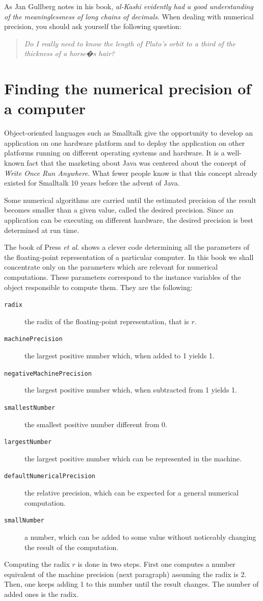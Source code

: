 \documentclass[twoside]{book}
\begin{document}
As Jan Gullberg notes in his book, {\it al-Kashi evidently had a
good understanding of the meaninglessness of long chains of
decimals}. When dealing with numerical precision, you should ask
yourself the following question:
\begin{quote}
{\sl Do I really need to know the length of Pluto's orbit to a
third of the thickness of a horse�s hair?}
\end{quote}

\section{Finding the numerical precision of a computer}
\label{sec:findprecision}
Object-oriented languages such as Smalltalk give the
opportunity to develop an application on one hardware platform and
to deploy the application on other platforms running on different
operating systems and hardware.
It is a well-known fact that the
marketing about Java was centered about the concept of {\sl Write
Once Run Anywhere}.
What fewer people know is that this concept
already existed for Smalltalk 10 years before the advent of Java.

Some numerical algorithms are carried until the estimated
precision of the result becomes smaller than a given value, called
the desired precision. Since an application can be executing on
different hardware, the desired precision is best determined at
run time.

The book of Press {\it et al.} \cite{Press} shows a clever code
determining all the parameters of the floating-point
representation of a particular computer. In this book we shall
concentrate only on the parameters which are relevant for
numerical computations. These parameters correspond to the
instance variables of the object responsible to compute them. They
are the following:
\begin{description}
\item[{\tt radix}] the radix of the floating-point representation, that is $r$.
\item[{\tt machinePrecision}] the largest positive number which, when added to 1 yields 1.
\item[{\tt negativeMachinePrecision}] the largest positive number which, when subtracted from 1 yields 1.
\item[{\tt smallestNumber}] the smallest positive number different from 0.
\item[{\tt largestNumber}] the largest positive number which can be represented in the machine.
\item[{\tt defaultNumericalPrecision}] the relative precision, which can be expected for a general numerical computation.
\item[{\tt smallNumber}] a number, which can be added to some value without noticeably changing the result of the computation.
\end{description}
Computing the radix $r$ is done in two steps. First one computes a
number equivalent of the machine precision (\cf next paragraph)
assuming the radix is 2. Then, one keeps adding 1 to this number
until the result changes. The number of added ones is the radix.
\end{document}
